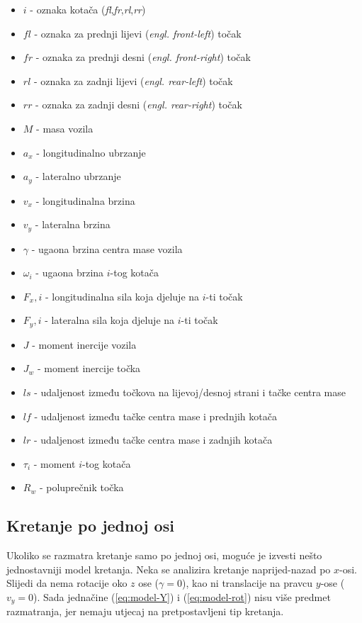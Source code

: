 \begin{itemize}
	\item $i$ - oznaka kotača (\textit{fl},\textit{fr},\textit{rl},\textit{rr})
	\item $fl$ - oznaka za prednji lijevi (\textit{engl. front-left}) točak
	\item $fr$ - oznaka za prednji desni (\textit{engl. front-right}) točak
	\item $rl$ - oznaka za zadnji lijevi (\textit{engl. rear-left}) točak
	\item $rr$ - oznaka za zadnji desni (\textit{engl. rear-right}) točak
	\item $M$ - masa vozila
	\item $a_x$ - longitudinalno ubrzanje
	\item $a_y$ - lateralno ubrzanje
	\item $v_x$ - longitudinalna brzina
	\item $v_y$ - lateralna brzina
	\item $\gamma$ - ugaona brzina centra mase vozila
	\item $\omega_i$ - ugaona brzina $i$-tog kotača
	\item $F_x,i$ - longitudinalna sila koja djeluje na $i$-ti točak
	\item $F_y,i$ - lateralna sila koja djeluje na $i$-ti točak
	\item $J$ - moment inercije vozila
	\item $J_w$ - moment inercije točka
	\item $ls$ - udaljenost između točkova na lijevoj/desnoj strani i tačke centra mase
	\item $lf$ - udaljenost između tačke centra mase i prednjih kotača
	\item $lr$ - udaljenost između tačke centra mase i zadnjih kotača
	\item $\tau_i$ - moment $i$-tog kotača
	\item $R_w$ - poluprečnik točka

\end{itemize}
	
\subsection{Kretanje po jednoj osi}

\qquad Ukoliko se razmatra kretanje samo po jednoj osi, moguće je izvesti nešto jednostavniji model kretanja. Neka se analizira kretanje naprijed-nazad po $x$-osi. Slijedi da nema rotacije oko $z$ ose ($\gamma=0$), kao ni translacije na pravcu $y$-ose ($v_y=0$). Sada jednačine (\ref{eq:model-Y}) i (\ref{eq:model-rot}) nisu više predmet razmatranja, jer nemaju utjecaj na pretpostavljeni tip kretanja.

